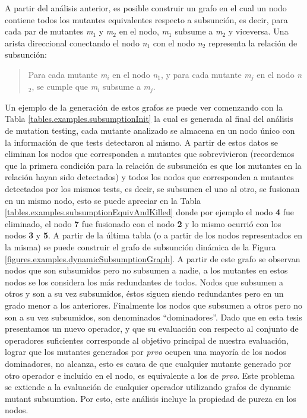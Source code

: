 A partir del an\'alisis anterior, es posible construir un grafo en el cual un nodo contiene todos los mutantes equivalentes respecto a subsunci\'on, es decir, para cada par de mutantes \emph{m$_1$} y \emph{m$_2$} en el nodo, \emph{m$_1$} subsume a \emph{m$_2$} y viceversa. Una arista direccional conectando el nodo \emph{n$_1$} con el nodo \emph{n$_2$} representa la relaci\'on de subsunci\'on:
\begin{quote}
	Para cada mutante \emph{m$_i$} en el nodo \emph{n$_1$}, y para cada mutante \emph{m$_j$} en el nodo \emph{n$_2$}, se cumple que \emph{m$_i$} subsume a \emph{m$_j$}.
\end{quote}
Un ejemplo de la generaci\'on de estos grafos se puede ver comenzando con la Tabla \ref{tables.examples.subsumptionInit} la cual es generada al final del an\'alisis de mutation testing, cada mutante analizado se almacena en un nodo \'unico con la informaci\'on de que tests detectaron al mismo. A partir de estos datos se eliminan los nodos que corresponden a mutantes que sobrevivieron (recordemos que la primera condici\'on para la relaci\'on de subsunci\'on es que los mutantes en la relaci\'on hayan sido detectados) y todos los nodos que corresponden a mutantes detectados por los mismos tests, es decir, se subsumen el uno al otro, se fusionan en un mismo nodo, esto se puede apreciar en la Tabla \ref{tables.examples.subsumptionEquivAndKilled} donde por ejemplo el nodo \textbf{4} fue eliminado, el nodo \textbf{7} fue fusionado con el nodo \textbf{2} y lo mismo ocurri\'o con los nodos \textbf{3} y \textbf{5}. A partir de la \'ultima tabla (o a partir de los nodos representados en la misma) se puede construir el grafo de subsunci\'on din\'amica de la Figura \ref{figures.examples.dynamicSubsumptionGraph}.
A partir de este grafo se observan nodos que son subsumidos pero no subsumen a nadie, a los mutantes en estos nodos se los considera los m\'as redundantes de todos. Nodos que subsumen a otros y son a su vez subsumidos, \'estos siguen siendo redundantes pero en un grado menor a los anteriores. Finalmente los nodos que subsumen a otros pero no son a su vez subsumidos, son denominados ``dominadores''. Dado que en esta tesis presentamos un nuevo operador, y que su evaluaci\'on con respecto al conjunto de operadores suficientes corresponde al objetivo principal de nuestra evaluaci\'on, lograr que los mutantes generados por \emph{prvo} ocupen una mayor\'ia de los nodos dominadores, no alcanza, esto es causa de que cualquier mutante generado por otro operador e inclu\'ido en el nodo, es equivalente a los de \emph{prvo}. Este problema se extiende a la evaluaci\'on de cualquier operador utilizando grafos de dynamic mutant subsumtion. Por esto, este an\'alisis incluye la propiedad de pureza en los nodos.

